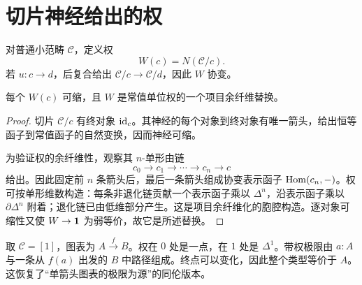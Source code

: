 \section{切片神经给出的权}
\begin{definition}
对普通小范畴 $\mathcal C$，定义权
\[
W(c)=N(\mathcal C/c).
\]
若 $u:c\to d$，后复合给出 $\mathcal C/c\to\mathcal C/d$，因此 $W$ 协变。
\end{definition}
\begin{proposition}
每个 $W(c)$ 可缩，且 $W$ 是常值单位权的一个项目余纤维替换。
\end{proposition}
\begin{proof}
切片 $\mathcal C/c$ 有终对象 $\operatorname{id}_c$。其神经的每个对象到终对象有唯一箭头，给出恒等函子到常值函子的自然变换，因而神经可缩。

为验证权的余纤维性，观察其 $n$-单形由链
\[
c_0\to c_1\to\cdots\to c_n\to c
\]
给出。因此固定前 $n$ 条箭头后，最后一条箭头组成协变表示函子 $\operatorname{Hom}(c_n,-)$。权可按单形维数构造：每条非退化链贡献一个表示函子乘以 $\Delta^n$，沿表示函子乘以 $\partial\Delta^n$ 附着；退化链已由低维部分产生。这是项目余纤维化的胞腔构造。逐对象可缩性又使 $W\to\mathbf 1$ 为弱等价，故它是所述替换。
\end{proof}
\begin{example}[单箭头图表的同伦极限]
取 $\mathcal C=[1]$，图表为 $A\xrightarrow fB$。权在 $0$ 处是一点，在 $1$ 处是 $\Delta^1$。带权极限由 $a:A$ 与一条从 $f(a)$ 出发的 $B$ 中路径组成。终点可以变化，因此整个类型等价于 $A$。这恢复了“单箭头图表的极限为源”的同伦版本。
\end{example}

